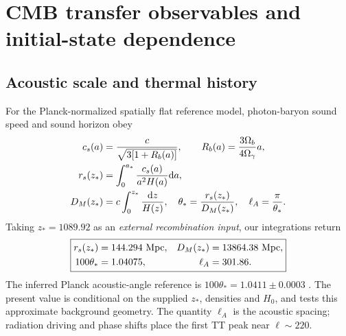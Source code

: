 \section{CMB transfer observables and initial-state dependence}\label{sec:cmb}

\subsection{Acoustic scale and thermal history}\label{sec:acoustic-scale}
For the Planck-normalized spatially flat reference model, photon-baryon sound speed and sound horizon obey
\begin{align}
c_s(a)&=\frac{c}{\sqrt{3[1+R_b(a)]}},\qquad R_b(a)=\frac{3\Omega_b}{4\Omega_\gamma}a,\\
r_s(z_*)&=\int_0^{a_*}\frac{c_s(a)}{a^2H(a)}\mathrm{d} a,\\
D_M(z_*)&=c\int_0^{z_*}\frac{\mathrm{d} z}{H(z)},\quad \theta_*=\frac{r_s(z_*)}{D_M(z_*)},\quad \ell_A=\frac\pi{\theta_*}.
\end{align}
Taking $z_*=1089.92$ as an \emph{external recombination input}, our integrations return
\begin{equation}
\boxed{\begin{aligned}
r_s(z_*)&=144.294\ \mathrm{Mpc},&D_M(z_*)&=13864.38\ \mathrm{Mpc},\\
100\theta_*&=1.04075,&\ell_A&=301.86.
\end{aligned}}
\end{equation}
The inferred Planck acoustic-angle reference is $100\theta_*=1.0411\pm0.0003$ \cite{Planck}. The present value is conditional on the supplied $z_*$, densities and $H_0$, and tests this approximate background geometry. The quantity $\ell_A$ is the acoustic spacing; radiation driving and phase shifts place the first TT peak near $\ell\sim220$.

